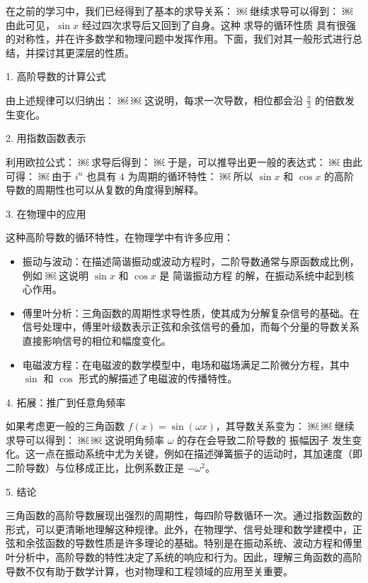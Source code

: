 在之前的学习中，我们已经得到了基本的求导关系：
￼
继续求导可以得到：
￼
由此可见，$\sin x$ 经过四次求导后又回到了自身。这种 求导的循环性质 具有很强的对称性，并在许多数学和物理问题中发挥作用。下面，我们对其一般形式进行总结，并探讨其更深层的性质。

1. 高阶导数的计算公式

由上述规律可以归纳出：
￼
￼
这说明，每求一次导数，相位都会沿 $\frac{\pi}{2}$ 的倍数发生变化。



2. 用指数函数表示

利用欧拉公式：
￼
求导后得到：
￼
于是，可以推导出更一般的表达式：
￼
由此可得：
￼
由于 $i^n$ 也具有 $4$ 为周期的循环特性：
￼
所以 $\sin x$ 和 $\cos x$ 的高阶导数的周期性也可以从复数的角度得到解释。

3. 在物理中的应用

这种高阶导数的循环特性，在物理学中有许多应用：
\begin{itemize}
\item 振动与波动：在描述简谐振动或波动方程时，二阶导数通常与原函数成比例，例如
￼
这说明 $\sin x$ 和 $\cos x$ 是 简谐振动方程 的解，在振动系统中起到核心作用。
\item 傅里叶分析：三角函数的周期性求导性质，使其成为分解复杂信号的基础。在信号处理中，傅里叶级数表示正弦和余弦信号的叠加，而每个分量的导数关系直接影响信号的相位和幅度变化。
\item 电磁波方程：在电磁波的数学模型中，电场和磁场满足二阶微分方程，其中 $\sin$ 和 $\cos$ 形式的解描述了电磁波的传播特性。
\end{itemize}

4. 拓展：推广到任意角频率

如果考虑更一般的三角函数 $f(x) = \sin(\omega x)$，其导数关系变为：
￼
￼
继续求导可以得到：
￼
￼
这说明角频率 $\omega$ 的存在会导致二阶导数的 振幅因子 发生变化。这一点在振动系统中尤为关键，例如在描述弹簧振子的运动时，其加速度（即二阶导数）与位移成正比，比例系数正是 $-\omega^2$。

5. 结论

三角函数的高阶导数展现出强烈的周期性，每四阶导数循环一次。通过指数函数的形式，可以更清晰地理解这种规律。此外，在物理学、信号处理和数学建模中，正弦和余弦函数的导数性质是许多理论的基础。特别是在振动系统、波动方程和傅里叶分析中，高阶导数的特性决定了系统的响应和行为。因此，理解三角函数的高阶导数不仅有助于数学计算，也对物理和工程领域的应用至关重要。